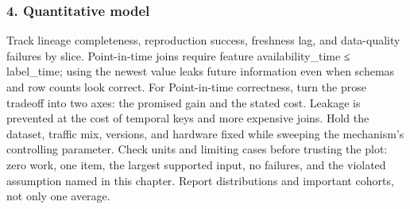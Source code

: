 \subsubsection*{4. Quantitative model}
Track lineage completeness, reproduction success, freshness lag, and data-quality failures by slice. Point-in-time joins require feature availability\_time ≤ label\_time; using the newest value leaks future information even when schemas and row counts look correct.
For Point-in-time correctness, turn the prose tradeoff into two axes: the promised gain and the stated cost. Leakage is prevented at the cost of temporal keys and more expensive joins. Hold the dataset, traffic mix, versions, and hardware fixed while sweeping the mechanism's controlling parameter.
Check units and limiting cases before trusting the plot: zero work, one item, the largest supported input, no failures, and the violated assumption named in this chapter. Report distributions and important cohorts, not only one average.
